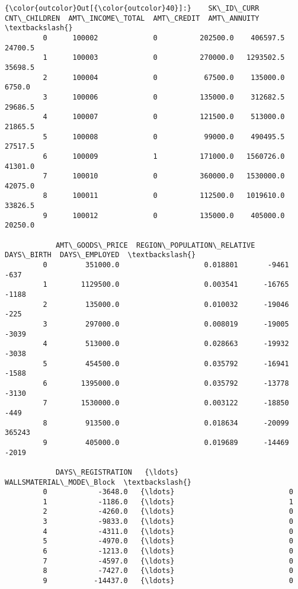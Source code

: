 \documentclass[11pt]{article}
\begin{document}
\begin{Verbatim}[commandchars=\\\{\}]
{\color{outcolor}Out[{\color{outcolor}40}]:}    SK\_ID\_CURR  CNT\_CHILDREN  AMT\_INCOME\_TOTAL  AMT\_CREDIT  AMT\_ANNUITY  \textbackslash{}
         0      100002             0          202500.0    406597.5      24700.5   
         1      100003             0          270000.0   1293502.5      35698.5   
         2      100004             0           67500.0    135000.0       6750.0   
         3      100006             0          135000.0    312682.5      29686.5   
         4      100007             0          121500.0    513000.0      21865.5   
         5      100008             0           99000.0    490495.5      27517.5   
         6      100009             1          171000.0   1560726.0      41301.0   
         7      100010             0          360000.0   1530000.0      42075.0   
         8      100011             0          112500.0   1019610.0      33826.5   
         9      100012             0          135000.0    405000.0      20250.0   
         
            AMT\_GOODS\_PRICE  REGION\_POPULATION\_RELATIVE  DAYS\_BIRTH  DAYS\_EMPLOYED  \textbackslash{}
         0         351000.0                    0.018801       -9461           -637   
         1        1129500.0                    0.003541      -16765          -1188   
         2         135000.0                    0.010032      -19046           -225   
         3         297000.0                    0.008019      -19005          -3039   
         4         513000.0                    0.028663      -19932          -3038   
         5         454500.0                    0.035792      -16941          -1588   
         6        1395000.0                    0.035792      -13778          -3130   
         7        1530000.0                    0.003122      -18850           -449   
         8         913500.0                    0.018634      -20099         365243   
         9         405000.0                    0.019689      -14469          -2019   
         
            DAYS\_REGISTRATION   {\ldots}    WALLSMATERIAL\_MODE\_Block  \textbackslash{}
         0            -3648.0   {\ldots}                           0   
         1            -1186.0   {\ldots}                           1   
         2            -4260.0   {\ldots}                           0   
         3            -9833.0   {\ldots}                           0   
         4            -4311.0   {\ldots}                           0   
         5            -4970.0   {\ldots}                           0   
         6            -1213.0   {\ldots}                           0   
         7            -4597.0   {\ldots}                           0   
         8            -7427.0   {\ldots}                           0   
         9           -14437.0   {\ldots}                           0   
         

\end{Verbatim}
\end{document}
